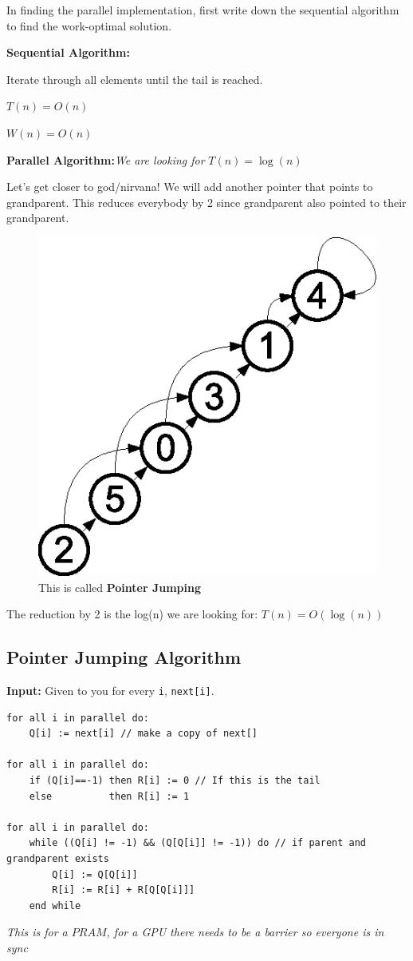 \documentclass[twoside]{article}
\begin{document}
In finding the parallel implementation, first write down the sequential algorithm to find the work-optimal solution.

\textbf{Sequential Algorithm:}

Iterate through all elements until the tail is reached.

$T(n)=O(n)$

$W(n)=O(n)$

\textbf{Parallel Algorithm:}\textit{We are looking for} $T(n)=\log(n)$

Let's get closer to god/nirvana! We will add another pointer that points to grandparent. This reduces everybody by 2 since grandparent also pointed to their grandparent. 

\begin{figure}[H]
\center
\includegraphics[scale=0.5]{img/pointer_jumping.eps}
\caption{This is called \textbf{Pointer Jumping}}
\end{figure}
The reduction by 2 is the log(n) we are looking for:
$T(n)=O(\log(n))$

\subsection{Pointer Jumping Algorithm} 

\textbf{Input:} Given to you for every \texttt{i}, \texttt{next[i]}.

\begin{lstlisting}
for all i in parallel do:
    Q[i] := next[i] // make a copy of next[]

for all i in parallel do:
    if (Q[i]==-1) then R[i] := 0 // If this is the tail
    else          then R[i] := 1

for all i in parallel do:
    while ((Q[i] != -1) && (Q[Q[i]] != -1)) do // if parent and grandparent exists
        Q[i] := Q[Q[i]]
        R[i] := R[i] + R[Q[Q[i]]]
    end while
\end{lstlisting}
\textit{This is for a $PRAM$, for a GPU there needs to be a barrier so everyone is in sync}
\end{document}
